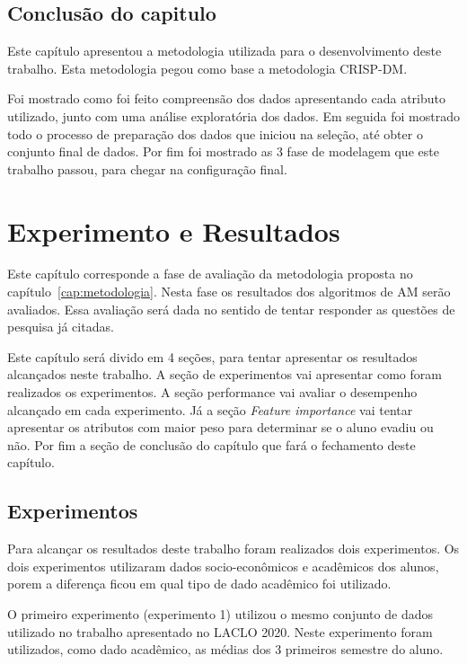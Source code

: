 \documentclass[diss,capa]{texufpel}
\begin{document}
\section{Conclusão do capitulo}

Este capítulo apresentou a metodologia utilizada para o desenvolvimento deste trabalho. Esta metodologia pegou como base a metodologia CRISP-DM.

Foi mostrado como foi feito compreensão dos dados apresentando cada atributo utilizado, junto com uma análise exploratória dos dados. Em seguida foi mostrado todo o processo de preparação dos dados que iniciou na seleção, até obter o conjunto final de dados. Por fim foi mostrado as 3 fase de modelagem que este trabalho passou, para chegar na configuração final.

\chapter{Experimento e Resultados}

Este capítulo corresponde a fase de avaliação da metodologia proposta no capítulo~\ref{cap:metodologia}.
Nesta fase os resultados dos algoritmos de AM serão avaliados.
Essa avaliação será dada no sentido de tentar responder as questões de pesquisa já citadas.

Este capítulo será divido em 4 seções, para tentar apresentar os resultados alcançados neste trabalho.
A seção de experimentos vai apresentar como foram realizados os experimentos.
A seção performance vai avaliar o desempenho alcançado em cada experimento.
Já a seção \textit{Feature importance} vai tentar apresentar os atributos com maior peso para determinar se o aluno evadiu ou não.
Por fim a seção de conclusão do capítulo que fará o fechamento deste capítulo.

\section{Experimentos}

Para alcançar os resultados deste trabalho foram realizados dois experimentos.
Os dois experimentos utilizaram dados socio-econômicos e acadêmicos dos alunos, porem a diferença ficou em qual tipo de dado acadêmico foi utilizado.

O primeiro experimento (experimento 1) utilizou o mesmo conjunto de dados utilizado no trabalho apresentado no LACLO 2020.
Neste experimento foram utilizados, como dado acadêmico, as médias dos 3 primeiros semestre do aluno.
\end{document}
